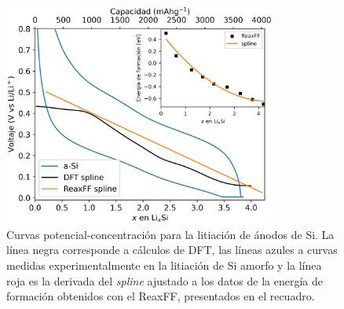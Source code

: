\begin{figure}[h!]
    \centering
    \includegraphics[width=0.8\textwidth]{Silicio/caracterizacion/resultados/electroquimica/voltaje.png}
    \caption{Curvas potencial-concentración para la litiación de ánodos de Si.
    La línea negra corresponde a cálculos de DFT, las líneas azules a 
    curvas medidas experimentalmente en la litiación de Si amorfo y la línea 
    roja es la derivada del \textit{spline} ajustado a los datos de la energía 
    de formación obtenidos con el ReaxFF, presentados en el recuadro.}
    \label{fig:voltaje}
\end{figure}
